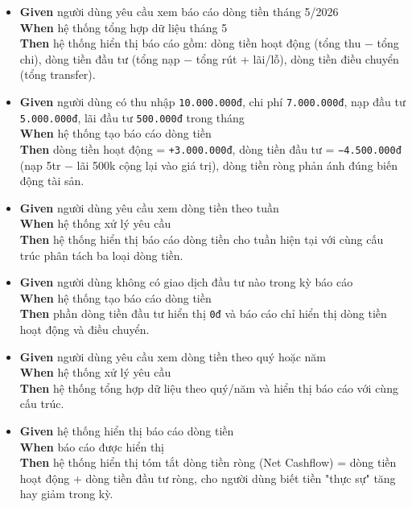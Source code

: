 \begin{itemize}
\item \textbf{Given} người dùng yêu cầu xem báo cáo dòng tiền tháng 5/2026  \\ \hspace*{1.5em}  \textbf{When} hệ thống tổng hợp dữ liệu tháng 5  \\ \hspace*{1.5em}  \textbf{Then} hệ thống hiển thị báo cáo gồm: dòng tiền hoạt động (tổng thu − tổng chi), dòng tiền đầu tư (tổng nạp − tổng rút + lãi/lỗ), dòng tiền điều chuyển (tổng transfer).
\item \textbf{Given} người dùng có thu nhập \texttt{10.000.000đ}, chi phí \texttt{7.000.000đ}, nạp đầu tư \texttt{5.000.000đ}, lãi đầu tư \texttt{500.000đ} trong tháng  \\ \hspace*{1.5em}  \textbf{When} hệ thống tạo báo cáo dòng tiền  \\ \hspace*{1.5em}  \textbf{Then} dòng tiền hoạt động = \texttt{+3.000.000đ}, dòng tiền đầu tư = \texttt{−4.500.000đ} (nạp 5tr − lãi 500k cộng lại vào giá trị), dòng tiền ròng phản ánh đúng biến động tài sản.
\item \textbf{Given} người dùng yêu cầu xem dòng tiền theo tuần  \\ \hspace*{1.5em}  \textbf{When} hệ thống xử lý yêu cầu  \\ \hspace*{1.5em}  \textbf{Then} hệ thống hiển thị báo cáo dòng tiền cho tuần hiện tại với cùng cấu trúc phân tách ba loại dòng tiền.
\item \textbf{Given} người dùng không có giao dịch đầu tư nào trong kỳ báo cáo  \\ \hspace*{1.5em}  \textbf{When} hệ thống tạo báo cáo dòng tiền  \\ \hspace*{1.5em}  \textbf{Then} phần dòng tiền đầu tư hiển thị \texttt{0đ} và báo cáo chỉ hiển thị dòng tiền hoạt động và điều chuyển.
\item \textbf{Given} người dùng yêu cầu xem dòng tiền theo quý hoặc năm  \\ \hspace*{1.5em}  \textbf{When} hệ thống xử lý yêu cầu  \\ \hspace*{1.5em}  \textbf{Then} hệ thống tổng hợp dữ liệu theo quý/năm và hiển thị báo cáo với cùng cấu trúc.
\item \textbf{Given} hệ thống hiển thị báo cáo dòng tiền  \\ \hspace*{1.5em}  \textbf{When} báo cáo được hiển thị  \\ \hspace*{1.5em}  \textbf{Then} hệ thống hiển thị tóm tắt dòng tiền ròng (Net Cashflow) = dòng tiền hoạt động + dòng tiền đầu tư ròng, cho người dùng biết tiền "thực sự" tăng hay giảm trong kỳ.
\end{itemize}

